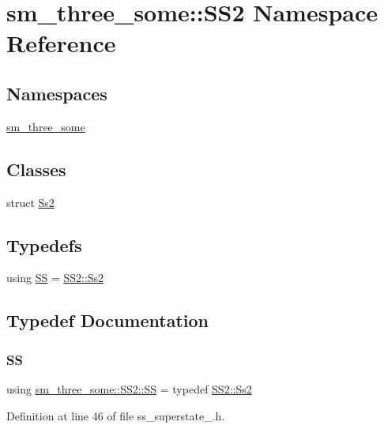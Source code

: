 \hypertarget{namespacesm__three__some_1_1SS2}{}\section{sm\+\_\+three\+\_\+some\+:\+:S\+S2 Namespace Reference}
\label{namespacesm__three__some_1_1SS2}
\subsection*{Namespaces}
\begin{DoxyCompactItemize}
\item 
 \hyperlink{namespacesm__three__some_1_1SS2_1_1sm__three__some}{sm\+\_\+three\+\_\+some}
\end{DoxyCompactItemize}
\subsection*{Classes}
\begin{DoxyCompactItemize}
\item 
struct \hyperlink{structsm__three__some_1_1SS2_1_1Ss2}{Ss2}
\end{DoxyCompactItemize}
\subsection*{Typedefs}
\begin{DoxyCompactItemize}
\item 
using \hyperlink{namespacesm__three__some_1_1SS2_adb18b566c3db9acef75fc2f0e9236b60}{SS} = \hyperlink{structsm__three__some_1_1SS2_1_1Ss2}{S\+S2\+::\+Ss2}
\end{DoxyCompactItemize}


\subsection{Typedef Documentation}
\mbox{\label{namespacesm__three__some_1_1SS2_adb18b566c3db9acef75fc2f0e9236b60}} 
\subsubsection{\texorpdfstring{SS}{SS}}
{\footnotesize\ttfamily using \hyperlink{namespacesm__three__some_1_1SS2_adb18b566c3db9acef75fc2f0e9236b60}{sm\+\_\+three\+\_\+some\+::\+S\+S2\+::\+SS} = typedef \hyperlink{structsm__three__some_1_1SS2_1_1Ss2}{S\+S2\+::\+Ss2}}



Definition at line 46 of file ss\+\_\+superstate\+\_.\+h.


